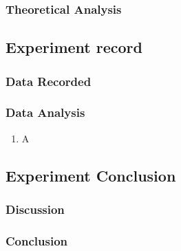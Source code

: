     \subsubsection{Theoretical Analysis}

\subsection{Experiment record}
    \subsubsection{Data Recorded}
    \subsubsection{Data Analysis}
    \begin{enumerate}


        \item A
    \end{enumerate}
\subsection{Experiment Conclusion}
    \subsubsection{Discussion}
    \subsubsection{Conclusion}

